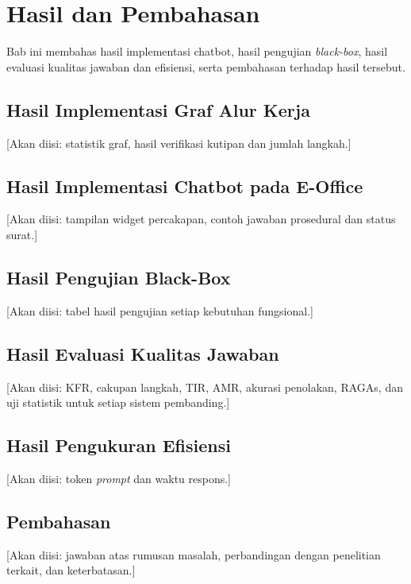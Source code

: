 \chapter{Hasil dan Pembahasan}
\label{bab:4}
Bab ini membahas hasil implementasi chatbot, hasil pengujian \textit{black-box}, hasil evaluasi kualitas jawaban dan efisiensi, serta pembahasan terhadap hasil tersebut.

\section{Hasil Implementasi Graf Alur Kerja}
[Akan diisi: statistik graf, hasil verifikasi kutipan dan jumlah langkah.]

\section{Hasil Implementasi Chatbot pada E-Office}
[Akan diisi: tampilan widget percakapan, contoh jawaban prosedural dan status surat.]

\section{Hasil Pengujian Black-Box}
[Akan diisi: tabel hasil pengujian setiap kebutuhan fungsional.]

\section{Hasil Evaluasi Kualitas Jawaban}
[Akan diisi: KFR, cakupan langkah, TIR, AMR, akurasi penolakan, RAGAs, dan uji statistik untuk setiap sistem pembanding.]

\section{Hasil Pengukuran Efisiensi}
[Akan diisi: token \textit{prompt} dan waktu respons.]

\section{Pembahasan}
[Akan diisi: jawaban atas rumusan masalah, perbandingan dengan penelitian terkait, dan keterbatasan.]
